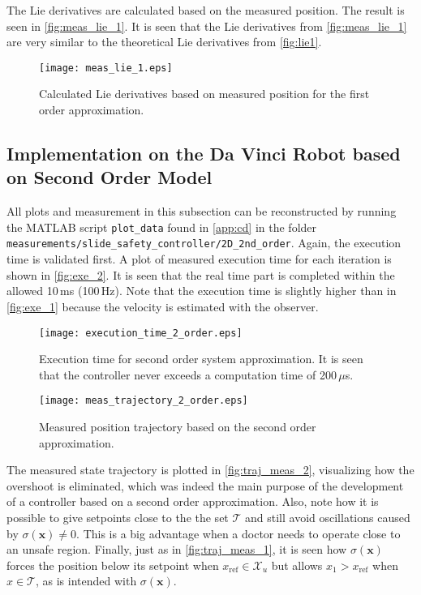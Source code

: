 The Lie derivatives are calculated based on the measured position. The result is seen in \autoref{fig:meas_lie_1}.
It is seen that the Lie derivatives from \autoref{fig:meas_lie_1} are very similar to the theoretical Lie derivatives from \autoref{fig:lie1}.

\begin{figure}[htbp]
\hspace{-3mm}
		\texttt{[image: meas\_lie\_1.eps]}
	\caption{Calculated Lie derivatives based on measured position for the first order approximation. }
    \label{fig:meas_lie_1}
\end{figure}


\subsection{Implementation on the Da Vinci Robot based on Second Order Model}\label{subsec-implement-2dmodel}
\vspace{-1mm}
All plots and measurement in this subsection can be reconstructed by running the MATLAB script \texttt{plot\_data} found in \autoref{app:cd} in the folder \texttt{measurements/slide\_safety\_controller/2D\_2nd\_order}. Again, the execution time is validated first. A plot of measured execution time for each iteration is shown in \autoref{fig:exe_2}.
It is seen that the real time part is completed within the allowed 10\,ms (100\,Hz). Note that the execution time is slightly higher than in \autoref{fig:exe_1} because the velocity is estimated with the observer.


\begin{figure}[htbp]
	\center
		\texttt{[image: execution\_time\_2\_order.eps]}
	\caption{Execution time for second order system approximation. It is seen that the controller never exceeds a computation time of 200\,$\mu$s.}
	\label{fig:exe_2}
\end{figure}



\vspace{-3mm}
\begin{figure}[H]
	\center
		\texttt{[image: meas\_trajectory\_2\_order.eps]}
	\caption{Measured position trajectory based on the second order approximation.}
    \label{fig:traj_meas_2}
\end{figure}
The measured state trajectory is plotted in \autoref{fig:traj_meas_2}, visualizing how the overshoot is eliminated, which was indeed the main purpose of the development of a controller based on a second order approximation. Also, note how it is possible to give setpoints close to the the set $\mathcal{T}$ and still avoid oscillations caused by $\sigma(\mathbf{x})\neq 0$. This is a big advantage when a doctor needs to operate close to an unsafe region. Finally, just as in \autoref{fig:traj_meas_1}, it is seen how $\sigma(\mathbf{x})$ forces the position below its setpoint when $x_\text{ref} \in \mathcal{X}_u$ but allows $x_1 > x_\text{ref}$ when $x \in \mathcal{T}$, as is intended with $\sigma(\mathbf{x})$.


